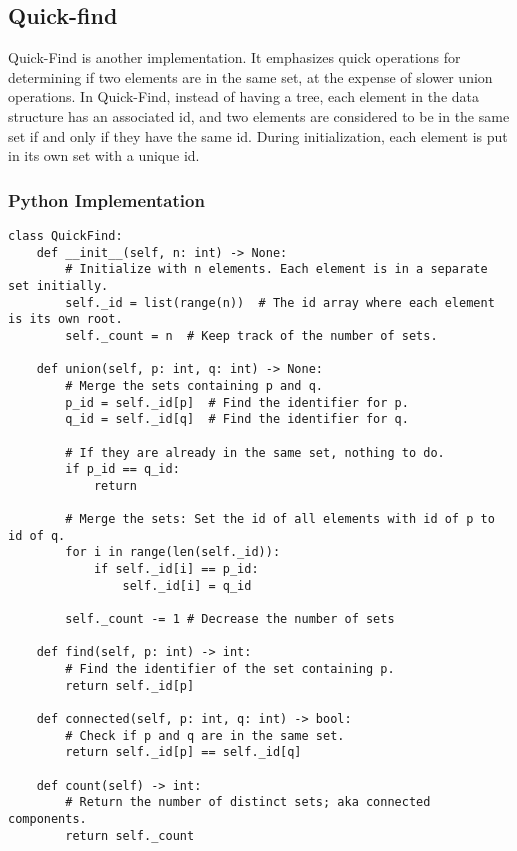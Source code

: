 \documentclass{article}
\begin{document}
\subsection{Quick-find}

Quick-Find is another implementation. It emphasizes quick operations for determining if two elements are in the same set, at the expense of slower union operations. In Quick-Find, instead of having a tree, each element in the data structure has an associated id, and two elements are considered to be in the same set if and only if they have the same id. During initialization, each element is put in its own set with a unique id.

\subsubsection*{Python Implementation}

\begin{verbatim}
class QuickFind:
    def __init__(self, n: int) -> None:
        # Initialize with n elements. Each element is in a separate set initially.
        self._id = list(range(n))  # The id array where each element is its own root.
        self._count = n  # Keep track of the number of sets.

    def union(self, p: int, q: int) -> None:
        # Merge the sets containing p and q.
        p_id = self._id[p]  # Find the identifier for p.
        q_id = self._id[q]  # Find the identifier for q.

        # If they are already in the same set, nothing to do.
        if p_id == q_id:
            return

        # Merge the sets: Set the id of all elements with id of p to id of q.
        for i in range(len(self._id)):
            if self._id[i] == p_id:
                self._id[i] = q_id
        
        self._count -= 1 # Decrease the number of sets

    def find(self, p: int) -> int:
        # Find the identifier of the set containing p.
        return self._id[p]

    def connected(self, p: int, q: int) -> bool:
        # Check if p and q are in the same set.
        return self._id[p] == self._id[q]
    
    def count(self) -> int:
        # Return the number of distinct sets; aka connected components.
        return self._count

\end{verbatim}
\end{document}
